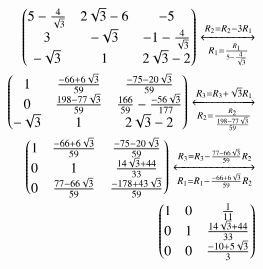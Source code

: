 \documentclass[journal,12pt,twocolumn]{IEEEtran}
\begin{document}
\begin{align}
 \begin{pmatrix}5-\frac{4}{\sqrt{3}}& 2\sqrt{3}-6 & -5\\ 3 & -\sqrt{3} & -1-\frac{4}{\sqrt{3}}\\  -\sqrt{3} & 1 & 2\sqrt{3}-2 \end{pmatrix} 
\xleftrightarrow[R_1=\frac{R_1}{5-\frac{4}{\sqrt{3}}}]{R_2=R_2-3R_1} \nonumber \\
 \begin{pmatrix}1& \frac{-66+6\sqrt{3}}{59} & \frac{-75-20\sqrt{3}}{59} \\ 0 &\frac{198-77\sqrt{3}}{59} & \frac{166}{59}-\frac{-56\sqrt{3}}{177}\\  -\sqrt{3} & 1 & 2\sqrt{3}-2 \end{pmatrix}  
 \xleftrightarrow[R_2=\frac{R_2}{\frac{198-77\sqrt{3}}{59}}]{R_3=R_3+\sqrt{3}R_1} \nonumber \\
 \begin{pmatrix}1& \frac{-66+6\sqrt{3}}{59} & \frac{-75-20\sqrt{3}}{59} \\
 0 &1 & \frac{14\sqrt{3}+44}{33} \\
 0 & \frac{77-66\sqrt{3}}{59} & \frac{-178+43\sqrt{3}}{59}\end{pmatrix}  \xleftrightarrow[{R_1=R_1-\frac{-66+6\sqrt{3}}{59}R_2}]{R_3=R_3-\frac{77-66\sqrt{3}}{59}R_2} \nonumber \\
  \begin{pmatrix}1& 0 & \frac{1}{11} \\
 0 &1 & \frac{14\sqrt{3}+44}{33} \\
 0 & 0 & \frac{-10+5\sqrt{3}}{3}\end{pmatrix} 
\end{align}
\end{document}
